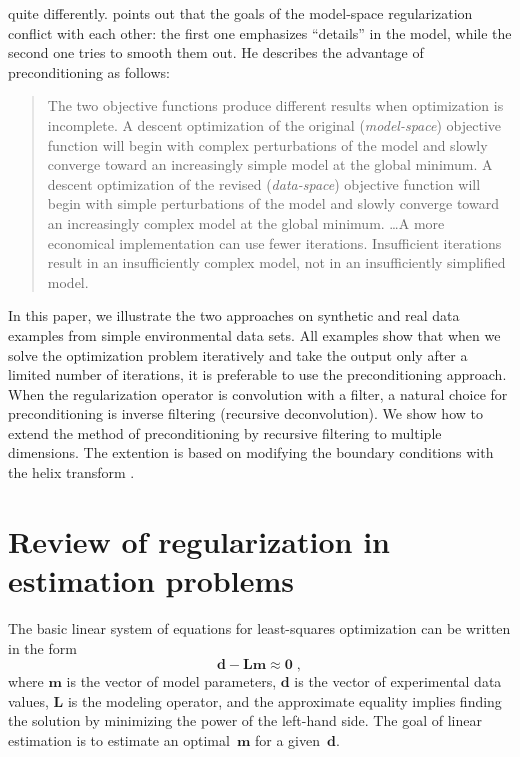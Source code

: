 quite differently.  \cite{harlan} points out that the goals of the
model-space regularization conflict with each other: the first one emphasizes
``details'' in the model, while the second one tries to smooth them out. He
describes the advantage of preconditioning as follows:
\begin{quote}
  The two objective functions produce different results when
  optimization is incomplete. A descent optimization of the original
  (\emph{model-space}) objective function will begin with complex
  perturbations of the model and slowly converge toward an
  increasingly simple model at the global minimum.  A descent
  optimization of the revised (\emph{data-space}) objective function
  will begin with simple perturbations of the model and slowly
  converge toward an increasingly complex model at the global minimum.
  \ldots A more economical implementation can use fewer iterations.
  Insufficient iterations result in an insufficiently complex model,
  not in an insufficiently simplified model.
\end{quote}

In this paper, we illustrate the two approaches on synthetic and real data
examples from simple environmental data sets. All examples show that when we
solve the optimization problem iteratively and take the output only after a
limited number of iterations, it is preferable to use the preconditioning
approach. When the regularization operator is convolution with a filter, a
natural choice for preconditioning is inverse filtering (recursive
deconvolution).  We show how to extend the method of preconditioning by
recursive filtering to multiple dimensions. The extention is based on
modifying the boundary conditions with the helix transform \cite[]{helix}.

\section{Review of regularization in estimation problems}

The basic linear system of equations for least-squares optimization
can be written in the form
\begin{equation}
  \mathbf{d - L m \approx 0}\;,
\label{eqn:main}
\end{equation}
where $\mathbf{m}$ is the vector of model parameters, $\mathbf{d}$ is the
vector of experimental data values, $\mathbf{L}$ is the modeling
operator, and the approximate equality implies finding the solution by
minimizing the power of the left-hand side.  The goal of linear
estimation is to estimate an optimal~$\mathbf{m}$ for a
given~$\mathbf{d}$.

